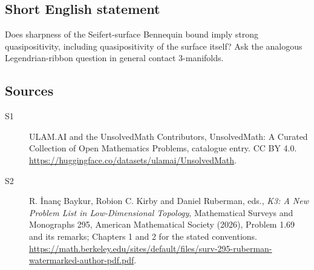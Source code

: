 \documentclass[11pt]{article}
\begin{document}
\subsection{Short English statement}
Does sharpness of the Seifert-surface Bennequin bound imply strong quasipositivity, including quasipositivity of the surface itself? Ask the analogous Legendrian-ribbon question in general contact 3-manifolds.
\subsection{Sources}
\begin{description}
\item[\hypertarget{source:statement:1}{S1}] ULAM.AI and the UnsolvedMath Contributors, UnsolvedMath: A Curated Collection of Open Mathematics Problems, catalogue entry. CC BY 4.0. \url{https://huggingface.co/datasets/ulamai/UnsolvedMath}.
\item[\hypertarget{source:statement:2}{S2}] R. İnanç Baykur, Robion C. Kirby and Daniel Ruberman, eds., \emph{K3: A New Problem List in Low-Dimensional Topology}, Mathematical Surveys and Monographs 295, American Mathematical Society (2026), Problem 1.69 and its remarks; Chapters 1 and 2 for the stated conventions. \url{https://math.berkeley.edu/sites/default/files/surv-295-ruberman-watermarked-author-pdf.pdf}.
\end{description}
\label{end:statement}
\end{document}
